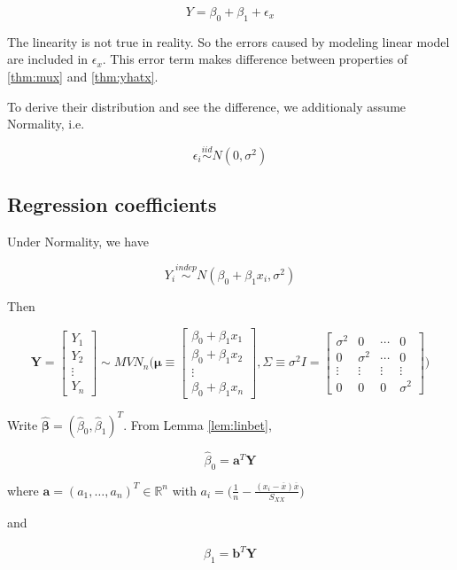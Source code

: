 \documentclass[]{book}
\theoremstyle{definition}
\theoremstyle{definition}
\theoremstyle{definition}
\theoremstyle{remark}
\begin{document}
\[Y = \beta_0 + \beta_1 + \epsilon_x\]

The linearity is not true in reality. So the errors caused by modeling linear model are included in \(\epsilon_x\). This error term makes difference between properties of \ref{thm:mux} and \ref{thm:yhatx}.

To derive their distribution and see the difference, we additionaly assume Normality, i.e.

\[\epsilon_i \stackrel{iid}{\sim} N(0, \sigma^2)\]

\hypertarget{simplebdist}{%
\subsection{Regression coefficients}\label{simplebdist}}

Under Normality, we have

\[Y_i \stackrel{indep}{\sim} N(\beta_0 + \beta_1 x_i, \sigma^2)\]

Then

\[
\mathbf{Y} = \begin{bmatrix}
  Y_1 \\
  Y_2 \\
  \vdots \\
  Y_n
\end{bmatrix} \sim MVN_n\Bigg( \boldsymbol\mu \equiv \begin{bmatrix}
  \beta_0 + \beta_1 x_1 \\
  \beta_0 + \beta_1 x_2 \\
  \vdots \\
  \beta_0 + \beta_1 x_n
\end{bmatrix}, \Sigma \equiv \sigma^2 I = \begin{bmatrix}
  \sigma^2 & 0 & \cdots & 0 \\
  0 & \sigma^2 & \cdots & 0 \\
  \vdots & \vdots & \vdots & \vdots \\
  0 & 0 & 0 & \sigma^2
\end{bmatrix} \Bigg)
\]

Write \(\boldsymbol{\hat\beta} = (\hat\beta_0, \hat\beta_1)^T\). From Lemma \ref{lem:linbet},

\[\hat\beta_0 = \mathbf{a}^T\mathbf{Y}\]

where \(\mathbf{a} = (a_1, \ldots, a_n)^T \in \mathbb{R}^n\) with \(a_i = \bigg( \frac{1}{n} - \frac{(x_i - \overline{x})\overline{x}}{S_{XX}} \bigg)\)

and

\[\hat\beta_1 = \mathbf{b}^T\mathbf{Y}\]
\end{document}
